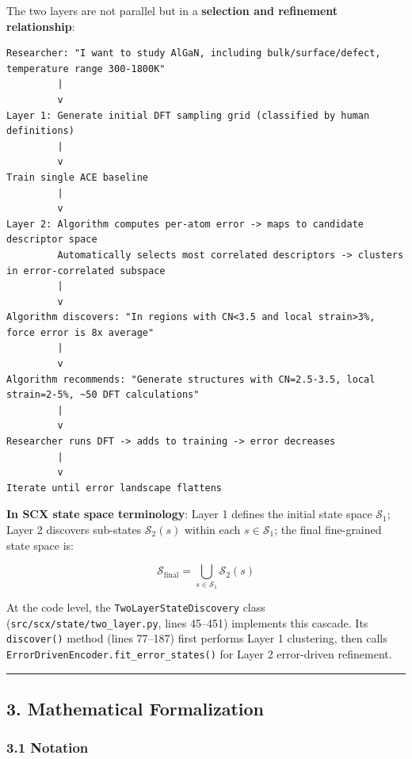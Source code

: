 \documentclass[
  12pt,
]{article}
\begin{document}
The two layers are not parallel but in a \textbf{selection and refinement relationship}:

\begin{verbatim}
Researcher: "I want to study AlGaN, including bulk/surface/defect, temperature range 300-1800K"
         |
         v
Layer 1: Generate initial DFT sampling grid (classified by human definitions)
         |
         v
Train single ACE baseline
         |
         v
Layer 2: Algorithm computes per-atom error -> maps to candidate descriptor space
         Automatically selects most correlated descriptors -> clusters in error-correlated subspace
         |
         v
Algorithm discovers: "In regions with CN<3.5 and local strain>3%, force error is 8x average"
         |
         v
Algorithm recommends: "Generate structures with CN=2.5-3.5, local strain=2-5%, ~50 DFT calculations"
         |
         v
Researcher runs DFT -> adds to training -> error decreases
         |
         v
Iterate until error landscape flattens
\end{verbatim}

\textbf{In SCX state space terminology}: Layer 1 defines the initial state space $\mathcal{S}_1$; Layer 2 discovers sub-states $\mathcal{S}_2(s)$ within each $s \in \mathcal{S}_1$; the final fine-grained state space is:

\[\mathcal{S}_{\text{final}} = \bigcup_{s \in \mathcal{S}_1} \mathcal{S}_2(s)\]

At the code level, the \texttt{TwoLayerStateDiscovery} class (\texttt{src/scx/state/two\_layer.py}, lines 45--451) implements this cascade. Its \texttt{discover()} method (lines 77--187) first performs Layer 1 clustering, then calls \texttt{ErrorDrivenEncoder.fit\_error\_states()} for Layer 2 error-driven refinement.

\begin{center}\rule{0.5\linewidth}{0.5pt}\end{center}

\subsection{3. Mathematical Formalization}\label{mathematical-formalization}

\subsubsection{3.1 Notation}\label{notation}
\end{document}
